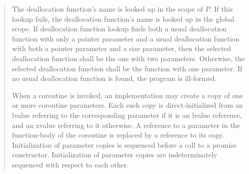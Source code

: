 \begin{quote}
\pnum
The deallocation function's name is looked up in the scope of $P$. If this lookup fails, the deallocation function's name is looked up in the global scope. If deallocation function lookup finds both a usual deallocation function with only a pointer parameter and a usual deallocation function with both a pointer parameter and a size parameter, then the selected deallocation function shall be the one with two parameters. Otherwise, the selected deallocation function shall be the function with one parameter. If no usual deallocation function is found, the program is ill-formed.


\pnum
When a coroutine is invoked, an implementation may create a copy of one or more coroutine parameters. Each such copy is direct-initialized from an lvalue referring to the corresponding parameter if it is an lvalue reference, and an xvalue referring to it otherwise. A reference to a parameter in the function-body of the coroutine is replaced by a reference to its copy.
Initialization of parameter copies is sequenced before a call to a promise constructor.
Initialization of parameter copies are indeterminately sequenced with respect to each other.

%
%




\end{quote}
